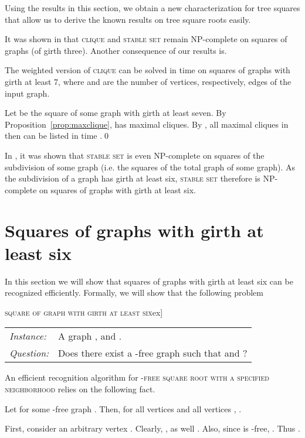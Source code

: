 \documentclass[proceedings]{stacs}
\newlength{\ai}
\begin{document}
Using the results in this section, we obtain a new characterization
for tree squares that allow us to derive the known results on tree
square roots easily.



It was shown in \cite{LinSki1995} that \textsc{clique} and \textsc{stable set} remain NP-complete on
squares of graphs (of girth three). Another consequence of our results is.

\begin{corollary}\label{coro:CLIQUE}
The weighted version of \textsc{clique} can be solved in  time on squares of graphs
with girth at least 7, where  and  are the number of vertices, respectively, edges of the
input graph.
\end{corollary}
\proof Let  be the square of some graph with girth at least seven.
By Proposition~\ref{prop:maxclique},  has  maximal cliques. By \cite{TIAS}, all maximal
cliques in  then can be listed in time .\qed

In \cite{HorKil}, it was shown that \textsc{stable set} is even NP-complete on squares of the subdivision
of some graph (i.e. the squares of the total graph of some graph). As the subdivision of a graph has girth
at least six, \textsc{stable set} therefore is NP-complete on squares of graphs with girth at least six.


\section{Squares of graphs with girth at least six}\label{sec:girthsix}
In this section we will show that squares of graphs with girth at least six can be recognized
efficiently. Formally, we will show that the following problem


\textsc{square of graph with girth at least six}\1ex]
\begin{tabular}{l l}
{\em Instance:}& A graph ,  and . \\
{\em Question:}& Does there exist a -free graph  such that  and ?\\
\end{tabular}

An efficient recognition algorithm for \textsc{-free square root with a specified neighborhood}
relies on the following fact.

\begin{lemma}\label{lem:c3c5-free}
Let  for some -free graph . Then, for all vertices  and
all vertices , .
\end{lemma}
\proof First, consider an arbitrary vertex . Clearly, , as well
 . Also, since  is -free, . Thus
 .
\end{document}
